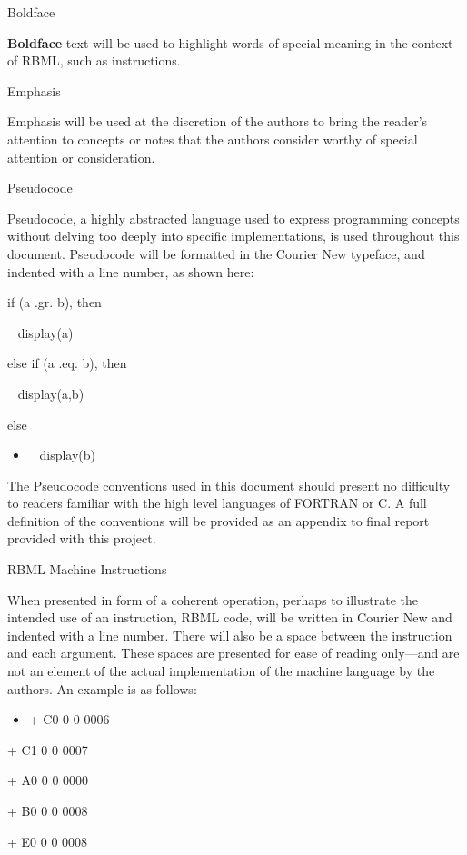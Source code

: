 \documentclass[]{article}
\providecommand{\tightlist}{%
  \setlength{\itemsep}{0pt}\setlength{\parskip}{0pt}}
\begin{document}
Boldface

\textbf{Boldface} text will be used to highlight words of special
meaning in the context of RBML, such as instructions.

Emphasis

Emphasis will be used at the discretion of the authors to bring the
reader's attention to concepts or notes that the authors consider worthy
of special attention or consideration.

Pseudocode

Pseudocode, a highly abstracted language used to express programming
concepts without delving too deeply into specific implementations, is
used throughout this document. Pseudocode will be formatted in the
Courier New typeface, and indented with a line number, as shown here:

if (a .gr. b), then

~ display(a)

else if (a .eq. b), then

~ display(a,b)

else

\begin{itemize}
\tightlist
\item
  ~ display(b)
\end{itemize}

The Pseudocode conventions used in this document should present no
difficulty to readers familiar with the high level languages of FORTRAN
or C. A full definition of the conventions will be provided as an
appendix to final report provided with this project.

RBML Machine Instructions

When presented in form of a coherent operation, perhaps to illustrate
the intended use of an instruction, RBML code, will be written in
Courier New and indented with a line number. There will also be a space
between the instruction and each argument. These spaces are presented
for ease of reading only---and are not an element of the actual
implementation of the machine language by the authors. An example is as
follows:

\begin{itemize}
\tightlist
\item
  + C0 0 0 0006
\end{itemize}

+ C1 0 0 0007

+ A0 0 0 0000

+ B0 0 0 0008

+ E0 0 0 0008
\end{document}
